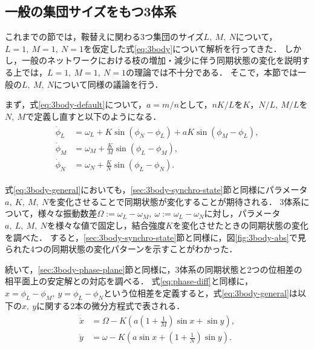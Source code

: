 \documentclass[../main]{subfiles}
\begin{document}
\subsection{一般の集団サイズをもつ3体系}
\label{sec:3body-general}
これまでの節では，鞍替えに関わる3つ集団のサイズ$L,\ M,\ N$について，$L=1,\ M=1,\ N=1$を仮定した式\eqref{eq:3body}について解析を行ってきた．
しかし，一般のネットワークにおける枝の増加・減少に伴う同期状態の変化を説明する上では，$L=1,\ M=1,\ N=1$の理論では不十分である．
そこで，本節では一般の$L,\ M,\ N$について同様の議論を行う．

まず，式\eqref{eq:3body-default}について，$a=m/n$として，$nK/L$を$K$，$N/L,\ M/L$を$N,\ M$で定義し直すと以下のようになる．
\begin{align}
    \label{eq:3body-general}
    \begin{split}
        \dot{\phi}_L&=\omega_L+K\sin\left( \phi_N-\phi_L \right)+aK\sin\left( \phi_M-\phi_L \right),\\
        \dot{\phi}_M&=\omega_M+\frac{K}{M}\sin\left( \phi_L-\phi_M \right), \\
        \dot{\phi}_N&=\omega_N+\frac{K}{N}\sin\left( \phi_L-\phi_N \right).    
    \end{split}
\end{align}

式\eqref{eq:3body-general}においても，\ref{sec:3body-synchro-state}節と同様にパラメータ$a,\ K,\ M,\ N$を変化させることで同期状態が変化することが期待される．
3体系について，様々な振動数差$\Omega:=\omega_L-\omega_M,\ \omega:=\omega_L-\omega_N$に対し，パラメータ$a,\ L,\ M,\ N$を様々な値で固定し，結合強度$K$を変化させたときの同期状態の変化を調べた．
すると，\ref{sec:3body-synchro-state}節と同様に，図\ref{fig:3body-abs}で見られた4つの同期状態の変化パターンを示すことがわかった．

続いて，\ref{sec:3body-phase-plane}節と同様に，3体系の同期状態と2つの位相差の相平面上の安定解との対応を調べる．
式\eqref{eq:phase-diff}と同様に，$x=\phi_L-\phi_M,\ y=\phi_L-\phi_N$という位相差を定義すると，式\eqref{eq:3body-general}は以下の$x,\ y$に関する2本の微分方程式で表される．
\begin{align}
    \label{eq:phase-diff-general}
    \begin{split}
        \dot{x}&=\Omega-K\left( a\left(1+\frac{1}{M}\right)\sin x +\sin y\right),\\
        \dot{y}&=\omega-K\left( a\sin x +\left(1+\frac{1}{N}\right)\sin y\right).
    \end{split}
\end{align}
\end{document}
